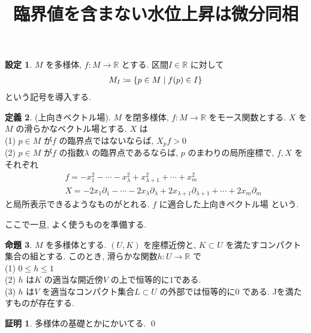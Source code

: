\documentclass[10pt, fleqn, label-section=none]{bxjsarticle}
\title{臨界値を含まない水位上昇は微分同相}
\date{}
\author{}
\theoremstyle{definition}
\newtheorem{dfn}{定義}[section]
\newtheorem{prop}[dfn]{命題}
\newtheorem{setting}[dfn]{設定}
\newtheorem*{pf*}{証明}
\newcommand{\cbra}[1]{\mleft\{#1\mright\}}
\renewcommand{\;}{\, ; \,}
\begin{document}
\maketitle

\section{}


\begin{setting} $M$ を多様体, $f: M \rightarrow \mathbb R$ とする. 区間$ I \in \mathbb R$ に対して
\begin{align*}  M_{I}  \coloneqq  \cbra{p \in M \mid f(p) \in  I}   \end{align*}
という記号を導入する. 
\end{setting}



\begin{dfn}(上向きベクトル場). $M$ を閉多様体, $f: M \rightarrow \mathbb R$ をモース関数とする. $X$ を$M$ の滑らかなベクトル場とする. $X$ は \\
(1) $p \in M$ が$f$ の臨界点ではないならば, $X_p f > 0$ \\
(2) $p \in M $ が$f$ の指数$\lambda$ の臨界点であるならば, $p$ のまわりの局所座標で, $f, X$ をそれぞれ \\  
\begin{align*} &\quad f = -x_1 ^2 - \cdots - x^2_{\lambda} + x^2_{\lambda + 1} + \cdots + x^2_m \\
&\quad X =  - 2x_1 \partial_1 - \cdots - 2 x_{\lambda } \partial_\lambda + 2 x_{\lambda + 1} \partial_{\lambda + 1} + \cdots + 2x_m \partial_m \end{align*}
と局所表示できるようなものがとれる. 
$f$ に適合した上向きベクトル場 という. 
\end{dfn}


ここで一旦, よく使うものを準備する.

\begin{prop}$M$ を多様体とする. $(U, K)$ を座標近傍と, $K \subset U$ を満たすコンパクト集合の組とする. このとき, 滑らかな関数$h : U \rightarrow \mathbb R$ で\\
(1) $0 \leq h \leq 1$ \\
(2) $h$ は$K$ の適当な開近傍$V$ の上で恒等的に$1$である. \\
(3) $h$ は$V$ を適当なコンパクト集合$L \subset U$ の外部では恒等的に$0$ である. ^^
を満たすものが存在する. 

\end{prop}
\begin{pf*}
多様体の基礎とかにかいてる.
\qed
\end{pf*}
\end{document}
